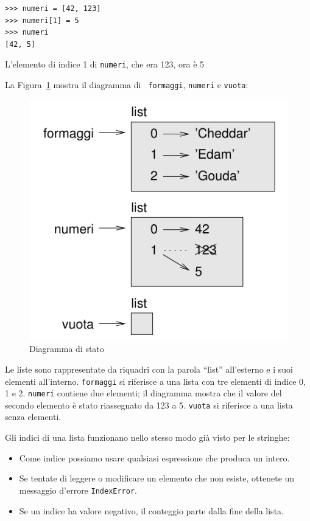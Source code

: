 \documentclass[10pt]{book}
\begin{document}
\begin{verbatim}
>>> numeri = [42, 123]
>>> numeri[1] = 5
>>> numeri
[42, 5]
\end{verbatim}
%
L'elemento di indice 1 di {\tt numeri}, che era 123, ora è 5

La Figura~\ref{fig.liststate} mostra il diagramma di {\tt
formaggi}, {\tt numeri} e {\tt vuota}:


\begin{figure}
\centerline
{\includegraphics[scale=0.8]{figs/liststate.pdf}}
\caption{Diagramma di stato}
\label{fig.liststate}
\end{figure}

Le liste sono rappresentate da riquadri con la parola ``list'' all'esterno e i suoi elementi all'interno.  {\tt formaggi} si riferisce a una lista con tre elementi di indice 0, 1 e 2.
{\tt numeri} contiene due elementi; il diagramma mostra che il valore del secondo elemento è stato riassegnato da 123 a 5. {\tt vuota} si riferisce a una lista senza elementi.

Gli indici di una lista funzionano nello stesso modo già visto per le stringhe:

\begin{itemize}

\item Come indice possiamo usare qualsiasi espressione che produca un intero.

\item Se tentate di leggere o modificare un elemento che non esiste, ottenete
   un messaggio d'errore {\tt IndexError}.

\item Se un indice ha valore negativo, il conteggio parte dalla fine della
   lista.

\end{itemize}
\end{document}
